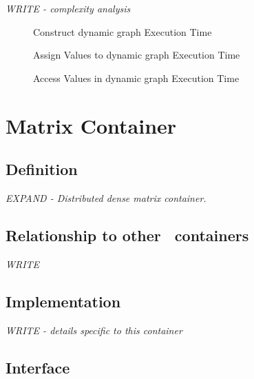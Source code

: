 \textit{WRITE - complexity analysis}

\begin{figure}[p]
\caption{Construct dynamic graph Execution Time}
\label{fig:dygraf-cont-constr-exper}
\end{figure}

\begin{figure}[p]
\caption{Assign Values to dynamic graph Execution Time}
\label{fig:dygraf-cont-assign-exper}
\end{figure}

\begin{figure}[p]
\caption{Access Values in dynamic graph Execution Time}
\label{fig:dygraf-cont-access-exper}
\end{figure}



\section { Matrix Container} \label{sec-mat-cont}

\subsection{Definition}

\textit{EXPAND - Distributed dense matrix container.}

\subsection{Relationship to other \stapl\ containers}

\textit{WRITE}

\subsection{Implementation}

\textit{WRITE - details specific to this container}

\subsection{Interface} \label{sec-mat-cont-inter}

